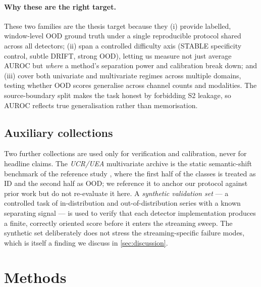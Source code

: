 \documentclass[11pt]{article}
\begin{document}
\paragraph{Why these are the right target.}
These two families are the thesis target because they (i) provide labelled,
window-level OOD ground truth under a single reproducible protocol shared across all
detectors; (ii) span a controlled difficulty axis (STABLE specificity control,
subtle DRIFT, strong OOD), letting us measure not just average AUROC but \emph{where}
a method's separation power and calibration break down; and (iii) cover both
univariate and multivariate regimes across multiple domains, testing whether OOD
scores generalise across channel counts and modalities. The source-boundary split
makes the task honest by forbidding S2 leakage, so AUROC reflects true
generalisation rather than memorisation.

\subsection{Auxiliary collections}\label{sec:aux}

Two further collections are used only for verification and calibration, never for
headline claims. The \emph{UCR/UEA} multivariate archive \citep{Dau2019, Bagnall2018}
is the static semantic-shift benchmark of the reference study \citep{Gungor2025},
where the first half of the classes is treated as ID and the second half as OOD; we
reference it to anchor our protocol against prior work but do not re-evaluate it
here. A \emph{synthetic validation set} --- a controlled task of in-distribution and
out-of-distribution series with a known separating signal --- is used to verify that
each detector implementation produces a finite, correctly oriented score before it
enters the streaming sweep. The synthetic set deliberately does not stress the
streaming-specific failure modes, which is itself a finding we discuss in
\cref{sec:discussion}.

\section{Methods}\label{sec:methods}
\end{document}
